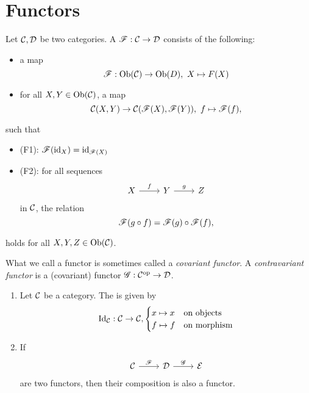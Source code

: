 \section{Functors}

\begin{defn}
  Let $\mathcal{C},\mathcal{D}$ be two categories. A  $\mathscr{F}:\mathcal{C}\to \mathcal{D}$ consists of the following:
  \begin{itemize}
    \item a map
    \[\mathscr{F}:\text{Ob}(\mathcal{C})\to \text{Ob}(D),~X\mapsto F(X)\]
    \item for all $X,Y\in \text{Ob}(\mathcal{C})$, a map
    \[
    \mathcal{C}(X,Y)\to \mathcal{C}(\mathscr{F}(X),\mathscr{F}(Y)),~f\mapsto \mathscr{F}(f),
    \]
  \end{itemize}
  such that
  \begin{itemize}
    \item (F1): $\mathscr{F}(\operatorname{id}_X)=\operatorname{id}_{\mathscr{F}(X)}$
    \item (F2): for all sequences
    \[
    \begin{tikzcd}
      X\ar{r}{f}&Y\ar{r}{g}&Z
    \end{tikzcd}
    \]
    in $\mathcal{C}$, the relation
    \[
    \mathscr{F}(g\circ f)= \mathscr{F}(g)\circ \mathscr{F}(f),
    \]
  \end{itemize}
  holds for all $X,Y,Z\in \text{Ob}(\mathcal{C})$.
\end{defn}

\begin{rem}
  What we call a functor is sometimes called a \textit{covariant functor}. A \textit{contravariant functor} is a (covariant) functor $\mathscr{G}:\mathcal{C}^{\mathrm{op}}\to \mathcal{D}$.
\end{rem}

\begin{rem}
  \begin{enumerate}
    \item Let $\mathcal{C}$ be a category. The  is given by
    \[
    \text{Id}_{\mathcal{C}}:\mathcal{C} \to \mathcal{C},\begin{cases}x\mapsto x&\text{on objects}\\f\mapsto f&\text{on morphism}\end{cases}\]
    \item If
    \[
    \begin{tikzcd}
      \ccat\ar{r}{\ffunc}&\dcat \ar{r}{\gfunc}&\ecat
    \end{tikzcd}
    \]
    are two functors, then their composition is also a functor.
  \end{enumerate}
\end{rem}

